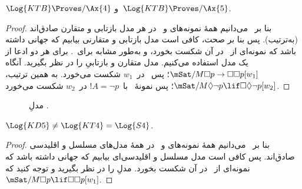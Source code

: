 \documentclass[../../../include/open-logic-section]{subfiles}
\begin{document}
\begin{thm}
  $\Log{KTB} \Proves/ \Ax{4}$ و~$\Log{KTB} \Proves/ \Ax{5}$.
\end{thm}

\begin{proof}
  بنا بر~ می‌دانیم همهٔ نمونه‌های
   و~ در هر مدل بازتابی و متقارن صادق‌اند (به‌ترتیب). پس
  بنا بر صحت، کافی است مدل بازتابی و متقارنی بیابیم که جهانی داشته باشد
  که نمونه‌ای از~ در آن شکست بخورد، و به‌طور مشابه برای~.
  برای هر دو ادعا از یک مدل استفاده می‌کنیم. مدل متقارن و بازتابیِ
   را در نظر بگیرید. آنگاه
  $\mSat/{M}{\Box p \to \Box \Box p}[w_1]$؛ پس~ در~$w_1$ شکست
  می‌خورد. به همین ترتیب،
  $\mSat/{M}{\Diamond \lnot p \lif \Box \Diamond \lnot p}[w_2]$؛ پس
  نمونهٔ~ با~$!A = \lnot p$ در~$w_2$ شکست می‌خورد.
\end{proof}

\begin{figure}[htpb]
  \centering
  \caption{مدلِ .}
\end{figure}

\begin{thm}
  $\Log{KD5} \neq \Log{KT4} = \Log{S4}$.
\end{thm}

\begin{proof}
  بنا بر~ می‌دانیم همهٔ نمونه‌های
   و~ در همهٔ مدل‌های مسلسل و اقلیدسی صادق‌اند. پس کافی
  است مدل مسلسل و اقلیدسی‌ای بیابیم که جهانی داشته باشد که نمونه‌ای
  از~ در آن شکست بخورد. مدلِ  را در نظر بگیرید
  و توجه کنید که~$\mSat/{M}{\Box p \lif \Box\Box p}[w_1]$.
\end{proof}
\end{document}
